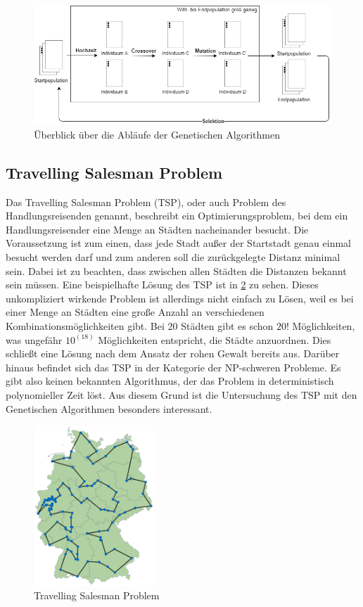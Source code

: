 \begin{figure}[H]
\centering
\includegraphics[width=1\textwidth]{img/Vortrag/Genetic_Algorithm.png}
\caption{Überblick über die Abläufe der Genetischen Algorithmen}
\label{fig:genetic_algorithm}
\end{figure}

\subsection{Travelling Salesman Problem}
Das Travelling Salesman Problem \cite[S. 132-133]{tsp} (TSP), oder auch Problem des Handlungsreisenden genannt, beschreibt ein Optimierungsproblem, bei dem ein Handlungsreisender eine Menge an Städten nacheinander besucht. Die Voraussetzung ist zum einen, dass jede Stadt außer der Startstadt genau einmal besucht werden darf und zum anderen soll die zurückgelegte Distanz minimal sein. Dabei ist zu beachten, dass zwischen allen Städten die Distanzen bekannt sein müssen.
Eine beispielhafte Lösung des TSP ist in \ref{fig:TSP} zu sehen. Dieses unkompliziert wirkende Problem ist allerdings nicht einfach zu Lösen, weil es bei einer Menge an Städten eine große Anzahl an verschiedenen Kombinationsmöglichkeiten gibt. Bei 20 Städten gibt es schon $20!$ Möglichkeiten, was ungefähr $10^(18)$ Möglichkeiten entspricht, die Städte anzuordnen. Dies schließt eine Lösung nach dem Ansatz der rohen Gewalt bereits aus. Darüber hinaus befindet sich das TSP in der Kategorie der NP-schweren Probleme. Es gibt also keinen bekannten Algorithmus, der das Problem in deterministisch polynomieller Zeit löst. Aus diesem Grund ist die Untersuchung des TSP mit den Genetischen Algorithmen besonders interessant.

\begin{figure}[H]
\centering
\includegraphics[width=0.4\textwidth]{img/Vortrag/tsp.png}
\caption{Travelling Salesman Problem}
\label{fig:TSP}
\end{figure}

